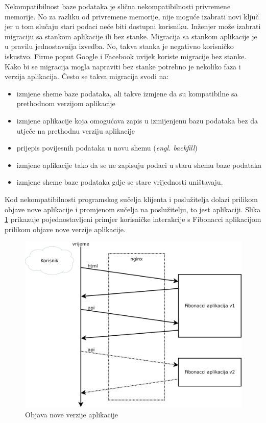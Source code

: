 Nekompatibilnost baze podataka je slična nekompatibilnosti privremene memorije. No za razliku od
privremene memorije, nije moguće izabrati novi ključ jer u tom slučaju stari podaci neće biti
dostupni korisniku. Inženjer može izabrati migraciju sa stankom aplikacije ili bez stanke. Migracija
sa stankom aplikacije je u pravilu jednostavnija izvedba. No, takva stanka je negativno korisničko
iskustvo. Firme poput Google i Facebook uvijek koriste migracije bez stanke. Kako bi se migracija
mogla napraviti bez stanke potrebno je nekoliko faza i verzija aplikacija. Često se takva migracija
svodi na:
\begin{itemize}
    \item izmjene sheme baze podataka, ali takve izmjene da su kompatibilne sa prethodnom verzijom
        aplikacije
    \item izmjene aplikacije koja omogućava zapis u izmijenjenu bazu podataka bez da utječe na
        prethodnu verziju aplikacije
    \item prijepis povijesnih podataka u novu shemu (\textit{engl. backfill})
    \item izmjene aplikacije tako da se ne zapisuju podaci u staru shemu baze podataka
    \item izmjene sheme baze podataka gdje se stare vrijednosti uništavaju.
\end{itemize}

Kod nekompatibilnosti programskog sučelja klijenta i poslužitelja dolazi prilikom objave nove
aplikacije i promjenom sučelja na poslužitelju, to jest aplikaciji. Slika \ref{fig:04request_flow}
prikazuje pojednostavljeni primjer korisničke interakcije s Fibonacci aplikacijom prilikom objave
nove verzije aplikacije.

\begin{figure}[h]
    \centering
    \includegraphics[width=\textwidth]{img/04/request_flow.png}
    \caption{Objava nove verzije aplikacije}%
    \label{fig:04request_flow}
\end{figure}

